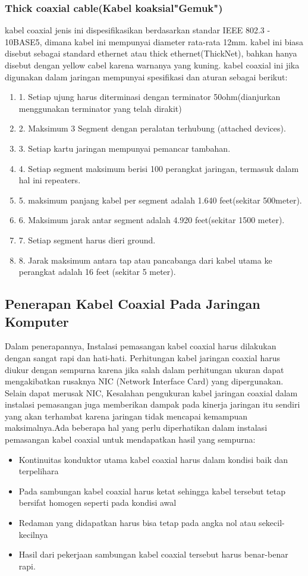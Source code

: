 \begin{itemize}
\begin{itemize}
\subsubsection{Thick coaxial cable(Kabel koaksial"Gemuk")}
kabel coaxial jenis ini dispesifikasikan berdasarkan standar IEEE 802.3 - 10BASE5, dimana kabel ini mempunyai diameter rata-rata 12mm. kabel ini biasa disebut sebagai standard ethernet atau thick ethernet(ThickNet), bahkan hanya disebut dengan yellow cabel karena warnanya yang kuning.
kabel coaxial ini jika digunakan dalam jaringan mempunyai spesifikasi dan aturan sebagai berikut:
\begin{enumerate}
	\item 1. Setiap ujung harus diterminasi dengan terminator 50ohm(dianjurkan menggunakan terminator yang telah dirakit)
	\item 2. Maksimum 3 Segment dengan peralatan terhubung (attached devices).
	\item 3. Setiap kartu jaringan mempunyai pemancar tambahan.
	\item 4. Setiap segment maksimum berisi 100 perangkat jaringan, termasuk dalam hal ini repeaters.
	\item 5. maksimum panjang kabel per segment adalah 1.640 feet(sekitar 500meter).
	\item 6. Maksimum jarak antar segment adalah 4.920 feet(sekitar 1500 meter).
	\item 7. Setiap segment harus dieri ground.
	\item 8. Jarak maksimum antara tap atau pancabanga dari kabel utama ke perangkat adalah 16 feet (sekitar 5 meter).
\end{enumerate}
	
	\subsection {Penerapan Kabel Coaxial Pada Jaringan Komputer}
	Dalam penerapannya, Instalasi pemasangan kabel coaxial harus dilakukan dengan sangat rapi dan hati-hati. Perhitungan kabel jaringan coaxial harus diukur dengan sempurna karena jika salah dalam perhitungan ukuran dapat mengakibatkan rusaknya NIC (Network Interface Card) yang dipergunakan. Selain dapat merusak NIC, Kesalahan pengukuran kabel jaringan coaxial dalam instalasi pemasangan juga memberikan dampak pada kinerja jaringan itu sendiri yang akan terhambat karena jaringan tidak mencapai kemampuan maksimalnya.Ada beberapa hal yang perlu diperhatikan dalam instalasi pemasangan kabel coaxial untuk mendapatkan hasil yang sempurna:
		\begin{itemize}
			\item Kontinuitas konduktor utama kabel coaxial harus dalam kondisi baik dan terpelihara
			\item Pada sambungan kabel coaxial harus ketat sehingga kabel tersebut tetap bersifat homogen seperti pada kondisi awal
			\item Redaman yang didapatkan harus bisa tetap pada angka nol atau sekecil-kecilnya
			\item Hasil dari pekerjaan sambungan kabel coaxial tersebut harus benar-benar rapi.
	


\end{itemize}
\end{itemize}
\end{itemize}
